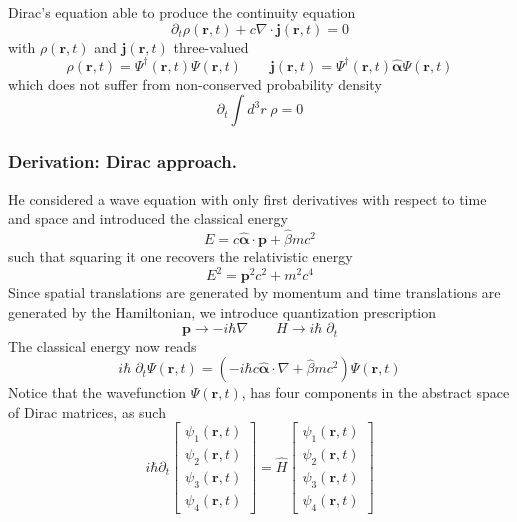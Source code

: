 \documentclass[../../../main.tex]{subfiles}
\begin{document}
Dirac's equation able to produce the continuity equation
\begin{equation*}
    \partial_t \rho(\mathbf{r },t) + c \nabla \cdot \mathbf{j}(\mathbf{r },t)=0
\end{equation*}
with $\rho(\mathbf{r },t)$ and $\mathbf{j}(\mathbf{r },t)$ three-valued
\begin{equation*}
    \rho  (\mathbf{r },t)= \Psi ^\dagger(\mathbf{r },t)\Psi(\mathbf{r },t) \qquad
    \mathbf{j}(\mathbf{r },t)=\Psi ^\dagger (\mathbf{r },t)\hat{\boldsymbol{\alpha } }\Psi(\mathbf{r },t)
\end{equation*}
which does not suffer from non-conserved probability density
\begin{equation*}
    \partial_t \int d^3r\;\rho =0
\end{equation*}

\subsubsection{Derivation: Dirac approach.}
He considered a wave equation with only first derivatives with respect to time and space and introduced the classical energy
\begin{equation*}
    E = c\boldsymbol{\hat{\alpha}}\cdot\mathbf{p} + \hat{\beta}m c^2
\end{equation*}
such that squaring it one recovers the relativistic energy
\begin{equation*}
    E ^{2 } =  \mathbf{p }^2c^2 +m^2c^4
\end{equation*}
Since spatial translations are generated by momentum and time translations are generated by the Hamiltonian, we introduce quantization prescription
\begin{equation*}
    \mathbf{p} \to -i\hbar\nabla \qquad
    H \to i\hbar \;\partial_t
\end{equation*}
The classical energy now reads
\begin{equation*}
    i\hbar \;\partial_t \Psi(\mathbf{r},t)=\left(-i\hbar c\hat{\boldsymbol{\alpha}}\cdot\nabla + \hat{\beta}m c^{2}\right)\Psi(\mathbf{r},t)
\end{equation*}
Notice that the wavefunction $\Psi(\mathbf{r },t)$, has four components in the abstract space of Dirac matrices, as such
\begin{equation*}
    i\hbar\partial_t
    \begin{bmatrix}
        \psi_1(\mathbf{r},t) \\
        \psi_2(\mathbf{r},t) \\
        \psi_3(\mathbf{r},t) \\
        \psi_4(\mathbf{r},t)
    \end{bmatrix}
    =
    \hat{H}
    \begin{bmatrix}
        \psi_1(\mathbf{r},t) \\
        \psi_2(\mathbf{r},t) \\
        \psi_3(\mathbf{r},t) \\
        \psi_4(\mathbf{r},t)
    \end{bmatrix}
\end{equation*}
\end{document}
